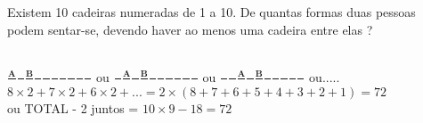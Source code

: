 \begin{ex}
 Existem 10 cadeiras numeradas de 1 a 10. De quantas formas duas pessoas podem sentar-se, devendo haver ao menos uma cadeira entre elas ?
 \begin{sol}
     \phantom{A} \\
 
 $\frac{\textbf{A}}{\phantom{8}}\frac{\phantom{A}}{\phantom{A}}\frac{\textbf{B}}{\phantom{8}}\frac{\phantom{A}}{\phantom{A}}\frac{\phantom{A}}{\phantom{A}}\frac{\phantom{A}}{\phantom{A}}\frac{\phantom{A}}{\phantom{A}}\frac{\phantom{A}}{\phantom{A}}\frac{\phantom{A}}{\phantom{A}}\frac{\phantom{A}}{\phantom{A}}$ ou $\frac{\phantom{A}}{\phantom{A}}\frac{\textbf{A}}{\phantom{A}}\frac{\phantom{A}}{\phantom{A}}\frac{\textbf{B}}{\phantom{A}}\frac{\phantom{A}}{\phantom{A}}\frac{\phantom{A}}{\phantom{A}}\frac{\phantom{A}}{\phantom{A}}\frac{\phantom{A}}{\phantom{A}}\frac{\phantom{A}}{\phantom{A}}\frac{\phantom{A}}{\phantom{A}}$ ou $\frac{\phantom{A}}{\phantom{A}}\frac{\phantom{A}}{\phantom{A}}\frac{\textbf{A}}{\phantom{A}}\frac{\phantom{A}}{\phantom{A}}\frac{\textbf{B}}{\phantom{A}}\frac{\phantom{A}}{\phantom{A}}\frac{\phantom{A}}{\phantom{A}}\frac{\phantom{A}}{\phantom{A}}\frac{\phantom{A}}{\phantom{A}}\frac{\phantom{A}}{\phantom{A}}$ ou.....\\
 \phantom{AA}$8\times2+7\times2+6\times2+...=2\times(8+7+6+5+4+3+2+1)=72$\\
 \phantom{AA} ou TOTAL - 2 juntos = $10\times9-18=72$
 
 
 
 
 
 \end{sol}
   
\end{ex}
